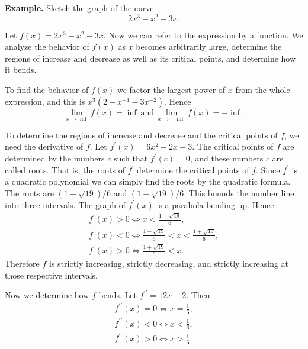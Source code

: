 
\textbf{Example.} Sketch the graph of the curve
\[2x^3 - x^2 - 3x.\]

Let $f(x) = 2x^3 - x^2 -3x$. Now we can refer to the expression by a function. We analyze the behavior of $f(x)$ as $x$ becomes arbitrarily large, determine the regions of increase and decrease as well as its critical points, and determine how it bends.

To find the behavior of $f(x)$ we factor the largest power of $x$ from the whole expression, and this is $x^3(2 - x^{-1} - 3x^{-2})$. Hence
\[\lim_{x\to\inf} f(x) = \inf\: \text{and}\: \lim_{x\to-\inf} f(x) = -\inf.\]

To determine the regions of increase and decrease and the critical points of $f$, we need the derivative of $f$. Let $f^\prime(x) = 6x^2 -2x - 3$. The critical points of $f$ are determined by the numbers $c$ such that $f^\prime(c) = 0$, and these numbers $c$ are called roots. That is, the roots of $f^\prime$ determine the critical points of $f$. Since $f^\prime$ is a quadratic polynomial we can simply find the roots by the quadratic formula. The roots are $(1 + \sqrt{19})/6$ and $(1 - \sqrt{19})/6$. This bounds the number line into three intervals. The graph of $f^\prime(x)$ is a parabola bending up. Hence
\begin{align}
f^\prime(x) > 0 \Leftrightarrow x < \frac{1 - \sqrt{19}}{6},\\
f^\prime(x) < 0 \Leftrightarrow \frac{1 - \sqrt{19}}{6} < x < \frac{1 + \sqrt{19}}{6},\\
f^\prime(x) > 0 \Leftrightarrow \frac{1 + \sqrt{19}}{6} < x.
\end{align}
Therefore $f$ is strictly increasing, strictly decreasing, and strictly increasing at those respective intervals.

Now we determine how $f$ bends. Let $f^{\prime\prime} = 12x - 2$. Then
\begin{align}
f^{\prime\prime}(x) = 0 \Leftrightarrow x = \frac{1}{6},\\
f^{\prime\prime}(x) < 0 \Leftrightarrow x < \frac{1}{6},\\
f^{\prime\prime}(x) > 0 \Leftrightarrow x > \frac{1}{6}.
\end{align}
